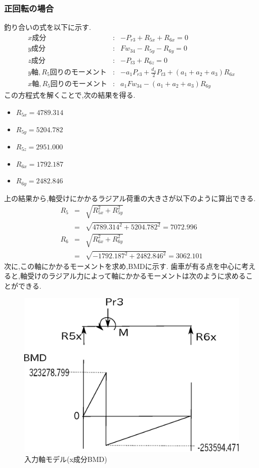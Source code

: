 \subsubsection{正回転の場合}
釣り合いの式を以下に示す.
\begin{eqnarray}
x成分&:&-P_{r3}+R_{5x}+R_{6x}=0\\
y成分&:&Fw_{34}-R_{5y}-R_{6y}=0\\
z成分&:&-P_{t3}+R_{6z}=0\\
y軸,R_5回りのモーメント&:&-a_1P_{r3}+\frac{d_4}{2}P_{t3}+(a_1+a_2+a_3)R_{6x}\\
x軸,R_5回りのモーメント&:&a_1Fw_{34}-(a_1+a_2+a_3)R_{6y}
\end{eqnarray}
この方程式を解くことで,次の結果を得る.
\begin{itemize}
\item $R_{5x}=4789.314$
\item $R_{5y}=5204.782$
\item $R_{5z}=2951.000$
\item $R_{6x}=1792.187$
\item $R_{6y}=2482.846$
\end{itemize}
上の結果から,軸受けにかかるラジアル荷重の大きさが以下のように算出できる.
\begin{eqnarray}
R_5 &=& \sqrt {R_{5x}^2+R_{5y}^2}\\
    &=& \sqrt {4789.314^2+5204.782^2}=7072.996\\
R_6 &=& \sqrt {R_{6x}^2+R_{6y}^2}\\
    &=& \sqrt {-1792.187^2+2482.846^2}=3062.101
\end{eqnarray}
次に,この軸にかかるモーメントを求め,BMDに示す.
歯車が有る点を中心に考えると,軸受けのラジアル力によって軸にかかるモーメントは次のように求めることができる.
\begin{figure}[htbp]
\begin{center}
\includegraphics[width=12cm]{../picture/jiku34.eps}
\end{center}
\caption{入力軸モデル(x成分BMD)}
\end{figure}
